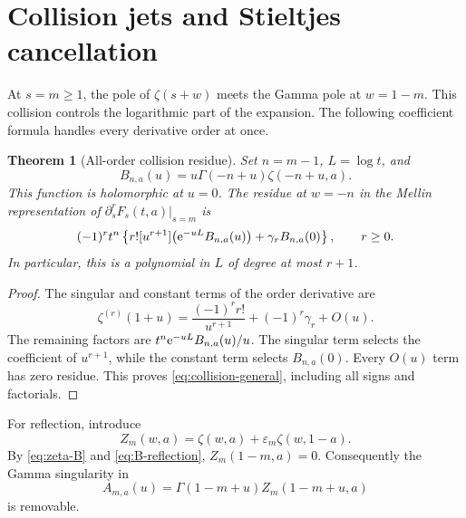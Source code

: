 \documentclass[11pt,a4paper]{article}
\numberwithin{equation}{section}
\newtheorem{theorem}{Theorem}[section]
\theoremstyle{definition}\newtheorem{definition}[theorem]{Definition}
\theoremstyle{remark}\newtheorem{remark}[theorem]{Remark}
\newcommand{\eps}{\varepsilon}\newcommand{\muh}{\widehat\mu}
\newcommand{\coef}[2]{[#1^{#2}]}
\begin{document}
\section{Collision jets and Stieltjes cancellation}
\label{sec:collision}

At $s=m\ge1$, the pole of $\zeta(s+w)$ meets the Gamma pole at
$w=1-m$. This collision controls the logarithmic part of the expansion.
The following coefficient formula handles every derivative order at
once.

\begin{theorem}[All-order collision residue]\label{thm:collision}
Set $n=m-1$, $L=\log t$, and
\begin{equation}
 B_{n,a}(u)=u\Gamma(-n+u)\zeta(-n+u,a).
 \label{eq:Bcollision}
\end{equation}
This function is holomorphic at $u=0$. The residue at $w=-n$ in the
Mellin representation of $\partial_s^rF_s(t,a)|_{s=m}$ is
\begin{equation}
 (-1)^rt^n\left\{
 r!\coef{u}{r+1}\bigl(\e^{-uL}B_{n,a}(u)\bigr)
                  +\gamma_r B_{n,a}(0)\right\},\qquad r\ge0.
 \label{eq:collision-general}
\end{equation}
In particular, this is a polynomial in $L$ of degree at most $r+1$.
\end{theorem}
\begin{proof}
The singular and constant terms of the order derivative are
\[
 \zeta^{(r)}(1+u)=\frac{(-1)^rr!}{u^{r+1}}
                            +(-1)^r\gamma_r+O(u).
\]
The remaining factors are $t^n\mathrm e^{-uL}B_{n,a}(u)/u$.
The singular term selects the coefficient of $u^{r+1}$, while the
constant term selects $B_{n,a}(0)$. Every $O(u)$ term has zero residue.
This proves \eqref{eq:collision-general}, including all signs and
factorials.
\end{proof}

For reflection, introduce
\begin{equation}
 Z_m(w,a)=\zeta(w,a)+\eps_m\zeta(w,1-a).
 \label{eq:Z}
\end{equation}
By \eqref{eq:zeta-B} and \eqref{eq:B-reflection},
$Z_m(1-m,a)=0$. Consequently the Gamma singularity in
\begin{equation}
 A_{m,a}(u)=\Gamma(1-m+u)Z_m(1-m+u,a)
 \label{eq:Acollision}
\end{equation}
is removable.
\end{document}
